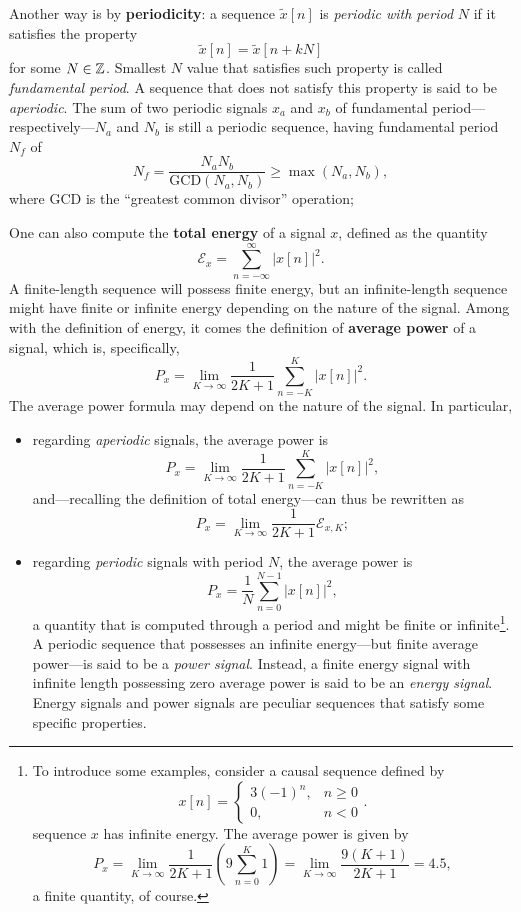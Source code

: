 \documentclass[\documentfontsize, twocolumn]{\classname}
\begin{document}
Another way is by \textbf{periodicity}: a se\-quen\-ce $\tilde{x}[n]$ is \emph{periodic with period} $N$ if it satisfies the property \[\tilde{x}[n] = \tilde{x}[n + kN]\] for some $N \in \mathbb Z$. Smallest $N$ value that satisfies such property is called \emph{fundamental period}. A se\-quen\-ce that does not satisfy this property is said to be \emph{aperiodic}. The sum of two periodic signals $x_a$ and $x_b$ of fundamental period---respectively---$N_a$ and $N_b$ is still a periodic se\-quen\-ce, having fundamental period $N_f$ of \[N_f = \frac{N_a N_b}{\mathrm{GCD}(N_a, N_b)} \geq \max{(N_a, N_b)},\] where $\mathrm{GCD}$ is the ``greatest common divisor'' operation;

One can also compute the \textbf{total energy} of a signal $x$, defined as the quantity 
\begin{equation}\label{eqn:totalEnergy}
    \mathcal E_x = \sum_{n=-\infty}^{\infty} | x[n] |^2.
\end{equation}
A finite-length se\-quen\-ce will possess finite energy, but an infinite-length se\-quen\-ce might have finite or infinite energy depending on the nature of the signal. Among with the definition of energy, it comes the definition of \textbf{average power} of a signal, which is, specifically,
\begin{equation}\label{eqn:averagePower}
    P_x = \lim_{K \rightarrow \infty} \frac{1}{2K + 1} \sum_{n = -K}^K |x[n]|^2.
\end{equation}
The average power formula may depend on the nature of the signal. In particular, 
\begin{itemize}
    \item regarding \emph{aperiodic} signals, the average power is
        \[ P_x = \lim_{K \rightarrow \infty} \frac{1}{2K + 1} \sum_{n = -K}^K |x[n]|^2, \]
    and---recalling the definition of total energy---can thus be rewritten as
    \[ P_x = \lim_{K \rightarrow \infty} \frac{1}{2K + 1} \mathcal E_{x,K}; \]
    \item regarding \emph{periodic} signals with period $N$, the average power is
        \[P_x = \frac{1}{N} \sum_{n = 0}^{N-1} |x[n]|^2,\] a quantity that is computed through a period and might be finite or infinite\footnote{To introduce some examples, consider a causal se\-quen\-ce defined by \[ x[n] = \left\{\begin{array}{lc}3(-1)^n, & n \geq 0\\ 0, & n < 0\end{array}\right. .\] se\-quen\-ce $x$ has infinite energy. The average power is given by \[P_x = \lim_{K\rightarrow \infty}\frac{1}{2K+1}\left(9\sum_{n=0}^K 1\right) = \lim_{K\rightarrow \infty}\frac{9(K+1)}{2K+1} = 4.5,\] a finite quantity, of course.}. A periodic se\-quen\-ce that possesses an infinite energy---but finite average power---is said to be a \emph{power signal}. Instead, a finite energy signal with infinite length possessing zero average power is said to be an \emph{energy signal}. Energy signals and power signals are peculiar se\-quen\-ces that satisfy some specific properties.
\end{itemize}
\end{document}
